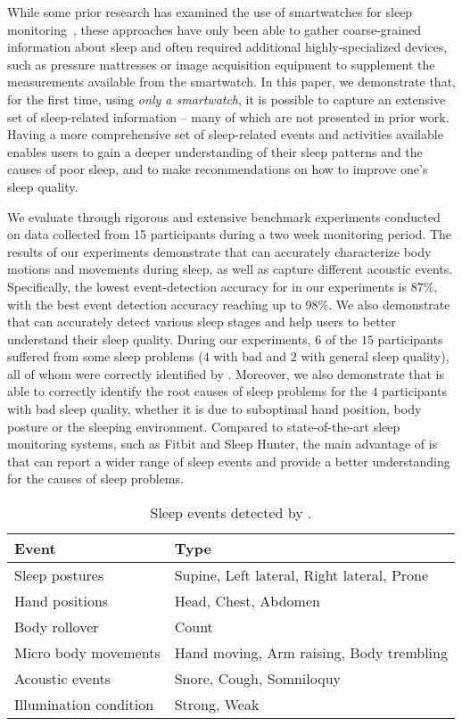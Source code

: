 While some prior research has examined the use of smartwatches for sleep
monitoring~\cite{pombo2016ubisleep,shelgikar2016sleep,haescher2015anomaly,borazio2012combining}, these approaches have only been able to
gather coarse-grained information about sleep and often required additional highly-specialized devices, such as pressure mattresses or
image acquisition equipment to supplement the measurements available from the smartwatch. In this paper, we demonstrate that, for the first
time, using {\em only a smartwatch}, it is possible to capture an extensive set of sleep-related information -- many of which are not
presented in prior work. Having a more comprehensive set of sleep-related events and activities available enables users to gain a deeper
understanding of their sleep patterns and the causes of poor sleep, and to make recommendations on how to improve one's sleep quality.

We evaluate {\systemname} through rigorous and extensive benchmark experiments conducted on data collected from 15 participants during a
two week monitoring period. The results of our experiments demonstrate that {\systemname} can accurately characterize body motions and
movements during sleep, as well as capture different acoustic events. Specifically, the lowest event-detection accuracy for {\systemname}
in our experiments is 87\%, with the best event detection accuracy reaching up to 98\%. We also demonstrate that {\systemname} can
accurately detect various sleep stages and help users to better understand their sleep quality. During our experiments, $6$ of the $15$
participants suffered from some sleep problems ($4$ with bad and $2$ with general sleep quality), all of whom were correctly identified by
{\systemname}. Moreover, we also demonstrate that {\systemname} is able to correctly identify the root causes of sleep problems for the $4$
participants with bad sleep quality, whether it is due to suboptimal hand position, body posture or the sleeping environment. Compared to
state-of-the-art sleep monitoring systems, such as Fitbit and Sleep Hunter, the main advantage of {\systemname} is that can report a wider
range of sleep events and provide a better understanding for the causes of sleep problems.

\begin{table}[!t]
 \caption{\label{tab:test}Sleep events detected by \systemname.}
 \centering
 \small
 \begin{tabular}{ll}
  \toprule
  \textbf{Event}& \textbf{Type} \\
  \midrule
\rowcolor{Gray}  Sleep postures & Supine, Left lateral, Right lateral, Prone\\
 Hand positions & Head, Chest, Abdomen\\
\rowcolor{Gray} Body rollover & Count\\
 Micro body movements& Hand moving, Arm raising, Body trembling \\
\rowcolor{Gray} Acoustic events & Snore, Cough, Somniloquy  \\
 Illumination condition & Strong, Weak  \\
  \bottomrule
 \end{tabular}
\end{table}


